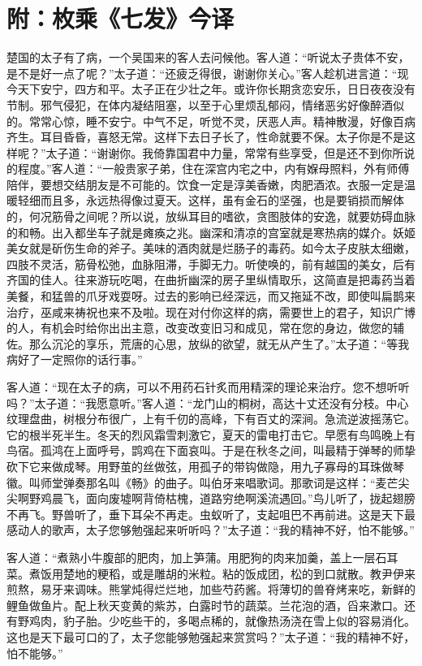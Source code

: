 \section[附：枚乘《七发》今译 ]{附：枚乘《七发》今译 }


楚国的太子有了病，一个吴国来的客人去问候他。客人道：“听说太子贵体不安，是不是好一点了呢？”太子道：“还疲乏得很，谢谢你关心。”客人趁机进言道：“现今天下安宁，四方和平。太子正在少壮之年。或许你长期贪恋安乐，日日夜夜没有节制。邪气侵犯，在体内凝结阻塞，以至于心里烦乱郁闷，情绪恶劣好像醉酒似的。常常心惊，睡不安宁。中气不足，听觉不灵，厌恶人声。精神散漫，好像百病齐生。耳目昏昏，喜怒无常。这样下去日子长了，性命就要不保。太子你是不是这样呢？”太子道：“谢谢你。我倚靠国君中力量，常常有些享受，但是还不到你所说的程度。”客人道：“一般贵家子弟，住在深宫内宅之中，内有媬母照料，外有师傅陪伴，要想交结朋友是不可能的。饮食一定是淳美香嫩，肉肥酒浓。衣服一定是温暖轻细而且多，永远热得像过夏天。这样，虽有金石的坚强，也是要销损而解体的，何况筋骨之间呢？所以说，放纵耳目的嗜欲，贪图肢体的安逸，就要妨碍血脉的和畅。出入都坐车子就是瘫痪之兆。幽深和清凉的宫室就是寒热病的媒介。妖姬美女就是斫伤生命的斧子。美味的酒肉就是烂肠子的毒药。如今太子皮肤太细嫩，四肢不灵活，筋骨松弛，血脉阻滞，手脚无力。听使唤的，前有越国的美女，后有齐国的佳人。往来游玩吃喝，在曲折幽深的房子里纵情取乐，这简直是把毒药当着美餐，和猛兽的爪牙戏耍呀。过去的影响已经深远，而又拖延不改，即使叫扁鹊来治疗，巫咸来祷祝也来不及啦。现在对付你这样的病，需要世上的君子，知识广博的人，有机会时给你出出主意，改变改变旧习和成见，常在您的身边，做您的辅佐。那么沉沦的享乐，荒唐的心思，放纵的欲望，就无从产生了。”太子道：“等我病好了一定照你的话行事。”

客人道：“现在太子的病，可以不用药石针炙而用精深的理论来治疗。您不想听听吗？”太子道：“我愿意听。”客人道：“龙门山的桐树，高达十丈还没有分枝。中心纹理盘曲，树根分布很广，上有千仞的高峰，下有百丈的深涧。急流逆波摇荡它。它的根半死半生。冬天的烈风霜雪刺激它，夏天的雷电打击它。早愿有鸟鸣晚上有鸟宿。孤鸿在上面呼号，鹍鸡在下面哀叫。于是在秋冬之间，叫最精于弹琴的师挚砍下它来做成琴。用野茧的丝做弦，用孤子的带钩做隐，用九子寡母的耳珠做琴徽。叫师堂弹奏那名叫《畅》的曲子。叫伯牙来唱歌词。那歌词是这样：“麦芒尖尖啊野鸡晨飞，面向废墟啊背倚枯槐，道路穷绝啊溪流遇回。”鸟儿听了，拢起翅膀不再飞。野兽听了，垂下耳朵不再走。虫蚁听了，支起咀巴不再前进。这是天下最感动人的歌声，太子您够勉强起来听听吗？”太子道：“我的精神不好，怕不能够。”

客人道：“煮熟小牛腹部的肥肉，加上笋蒲。用肥狗的肉来加羹，盖上一层石耳菜。煮饭用楚地的粳稻，或是雕胡的米粒。粘的饭成团，松的到口就散。教尹伊来煎熬，易牙来调味。熊掌炖得烂烂地，加些芍药酱。将薄切的兽脊烤来吃，新鲜的鲤鱼做鱼片。配上秋天变黄的紫苏，白露时节的蔬菜。兰花泡的酒，舀来漱口。还有野鸡肉，豹子胎。少吃些干的，多喝点稀的，就像热汤浇在雪上似的容易消化。这也是天下最可口的了，太子您能够勉强起来赏赏吗？”太子道：“我的精神不好，怕不能够。”

